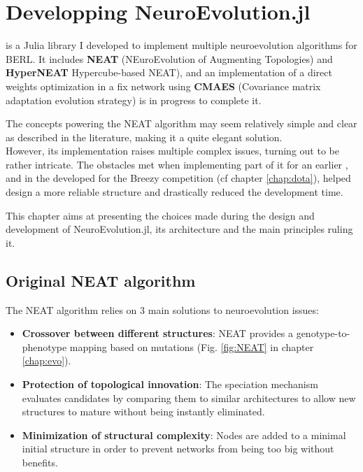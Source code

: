\chapter{Developping NeuroEvolution.jl}
\label{chap:neuroevo}

 is a Julia library I developed to implement multiple neuroevolution algorithms for BERL. It includes \textbf{NEAT} (NEuroEvolution of Augmenting Topologies) and \textbf{HyperNEAT} Hypercube-based NEAT), and an implementation of a direct weights optimization in a fix network using \textbf{CMAES} (Covariance matrix adaptation evolution strategy) is in progress to complete it. 

The concepts powering the NEAT algorithm may seem relatively simple and clear as described in the literature, making it a quite elegant solution. \\
However, its implementation raises multiple complex issues, turning out to be rather intricate. The obstacles met when implementing part of it for an earlier ,  and in the  developed for the Breezy competition (cf chapter \ref{chap:dota}), helped design a more reliable structure and drastically reduced the development time.

This chapter aims at presenting the choices made during the design and development of NeuroEvolution.jl, its architecture and the main principles ruling it. 

\section{Original NEAT algorithm}
\label{sec:og-neat}

The NEAT algorithm relies on 3 main solutions to neuroevolution issues:
\begin{itemize}
    \item \textbf{Crossover between different structures}: NEAT provides a genotype-to-phenotype mapping based on mutations (Fig. \ref{fig:NEAT} in chapter \ref{chap:evo}).
    \item \textbf{Protection of topological innovation}: The speciation mechanism evaluates candidates by comparing them to similar architectures to allow new structures to mature without being instantly eliminated. 
    \item \textbf{Minimization of structural complexity}: Nodes are added to a minimal initial structure in order to prevent networks from being too big without benefits.
\end{itemize}

